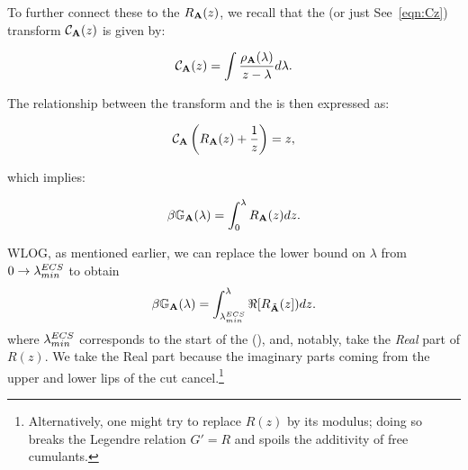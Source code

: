 To further connect these to the \RTransform $R_{\mathbf{A}}(z)$, we recall that the \CauchyStieltjes (or just \Cauchy See~\ref{eqn:Cz}) transform $\mathcal{C}_{\mathbf{A}}(z)$  is given by:

\begin{equation}
\mathcal{C}_{\mathbf{A}}(z) = \int \frac{\rho_{\mathbf{A}}(\lambda)}{z - \lambda} d\lambda.
\end{equation}

The relationship between the \Cauchy transform and the \RTransform is  then expressed as:

\begin{equation}
\mathcal{C}_{\mathbf{A}}\left(R_{\mathbf{A}}(z) + \frac{1}{z}\right) = z,
\end{equation}

which implies:

\begin{equation}
\beta\mathbb{G}_{\mathbf{A}}(\lambda) = \int_0^{\lambda} R_{\mathbf{A}}(z) dz.
\end{equation}

WLOG, as mentioned earlier, we can replace the lower bound on $\lambda$ from
$0\rightarrow\lambda^{ECS}_{min}$ to obtain
\begin{equation}
\beta\mathbb{G}_{\mathbf{A}}(\lambda) = \int_{\lambda^{ECS}_{min}}^{\lambda} \Re[R_{\tilde{\mathbf{A}}}(z]) dz.
\end{equation}
where $\lambda^{ECS}_{min}$ corresponds to the start of the \EffectiveCorrelationSpace (\ECS),
and, notably,  take the \emph{Real} part of $R(z)$.
We take the Real part because the imaginary parts coming from the upper and lower lips of
the cut cancel.\footnote{
Alternatively, one might try to replace $R(z)$ by its modulus;
doing so breaks the Legendre relation $G' = R$ and spoils the
additivity of free cumulants.}









